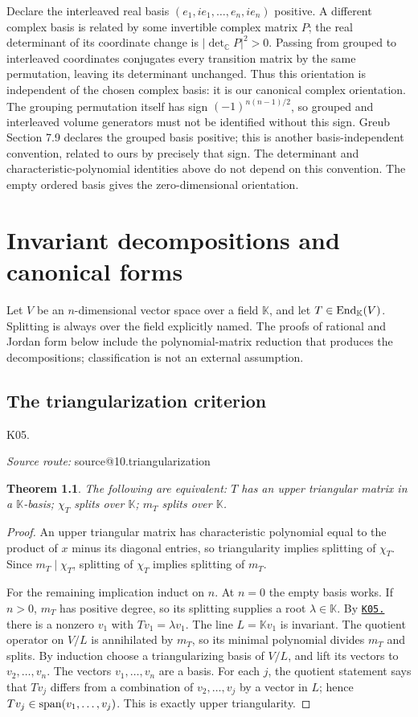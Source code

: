 \documentclass[11pt,a4paper]{book}
\makeatletter
\newtheorem{theorem}{Theorem}[chapter]
\theoremstyle{definition}\newtheorem{definition}[theorem]{Definition}
\theoremstyle{remark}\newtheorem{remark}[theorem]{Remark}
\newcommand{\K}{\mathbb K}\newcommand{\R}{\mathbb R}\newcommand{\C}{\mathbb C}
\newcommand{\abs}[1]{\lvert #1\rvert}
\newcommand{\kref}[1]{\hyperref[k:#1]{\texttt{K05.\detokenize{#1}}}}
\newcommand{\Kentry}[2]{\section{#2}\label{k:#1}\noindent\textsf{\small K05.\detokenize{#1}}\par
  \begingroup\small\color{black!65}\textit{Source route: }\csname source@#1\endcsname\par\endgroup}
\makeatother
\begin{document}
Declare the interleaved real basis $(e_1,ie_1,\ldots,e_n,ie_n)$ positive. A different complex basis is related by some invertible complex matrix $P$; the real determinant of its coordinate change is $\abs{\det_\C P}^2>0$. Passing from grouped to interleaved coordinates conjugates every transition matrix by the same permutation, leaving its determinant unchanged. Thus this orientation is independent of the chosen complex basis: it is our canonical complex orientation. The grouping permutation itself has sign $(-1)^{n(n-1)/2}$, so grouped and interleaved volume generators must not be identified without this sign. Greub Section 7.9 declares the grouped basis positive; this is another basis-independent convention, related to ours by precisely that sign. The determinant and characteristic-polynomial identities above do not depend on this convention. The empty ordered basis gives the zero-dimensional orientation.



\chapter{Invariant decompositions and canonical forms}
Let $V$ be an $n$-dimensional vector space over a field $\K$, and let $T\in\End_\K(V)$. Splitting is always over the field explicitly named. The proofs of rational and Jordan form below include the polynomial-matrix reduction that produces the decompositions; classification is not an external assumption.

\Kentry{10.triangularization}{The triangularization criterion}
\begin{theorem}
The following are equivalent: $T$ has an upper triangular matrix in a $\K$-basis; $\chi_T$ splits over $\K$; $m_T$ splits over $\K$.
\end{theorem}
\begin{proof}
An upper triangular matrix has characteristic polynomial equal to the product of $x$ minus its diagonal entries, so triangularity implies splitting of $\chi_T$. Since $m_T\mid\chi_T$, splitting of $\chi_T$ implies splitting of $m_T$.

For the remaining implication induct on $n$. At $n=0$ the empty basis works. If $n>0$, $m_T$ has positive degree, so its splitting supplies a root $\lambda\in\K$. By \kref{08.eigen_roots} there is a nonzero $v_1$ with $Tv_1=\lambda v_1$. The line $L=\K v_1$ is invariant. The quotient operator on $V/L$ is annihilated by $m_T$, so its minimal polynomial divides $m_T$ and splits. By induction choose a triangularizing basis of $V/L$, and lift its vectors to $v_2,\ldots,v_n$. The vectors $v_1,\ldots,v_n$ are a basis. For each $j$, the quotient statement says that $Tv_j$ differs from a combination of $v_2,\ldots,v_j$ by a vector in $L$; hence $Tv_j\in\operatorname{span}(v_1,\ldots,v_j)$. This is exactly upper triangularity.
\end{proof}
\end{document}
